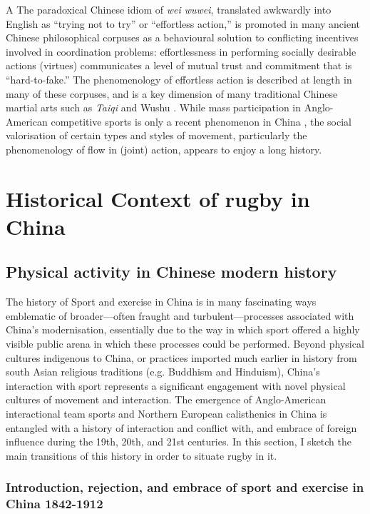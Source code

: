 \begin{CJK}{UTF8}{gbsn}
A The paradoxical Chinese idiom of \textit{wei wuwei}, translated awkwardly into English as ``trying not to try'' or ``effortless action,'' is promoted in many ancient Chinese philosophical corpuses as a behavioural solution to conflicting incentives involved in coordination problems: effortlessness in performing socially desirable actions (virtues) communicates a level of mutual trust and commitment that is ``hard-to-fake.''  The phenomenology of effortless action is described at length in many of these corpuses, and is a key dimension of many traditional Chinese martial arts such as \textit{Taiqi} and Wushu \citep{Morris1998}.  While mass participation in Anglo-American competitive sports is only a recent phenomenon in China \citep{Brownell2008}, the social valorisation of certain types and styles of movement, particularly the phenomenology of flow in (joint) action, appears to enjoy a long history.











\section{Historical Context of rugby in China}

\subsection{Physical activity in Chinese modern history}
The history of Sport and exercise in China is in many fascinating ways emblematic of broader---often fraught and turbulent---processes associated with China's modernisation, essentially due to the way in which sport offered a highly visible public arena in which these processes could be performed.  Beyond physical cultures indigenous to China, or practices imported much earlier in history from south Asian religious traditions (e.g. Buddhism and Hinduism), China's interaction with sport represents a significant engagement with novel physical cultures of movement and interaction.  The emergence of Anglo-American interactional team sports and Northern European calisthenics in China is entangled with a history of interaction and conflict with, and embrace of foreign influence during the 19th, 20th, and 21st centuries.  In this section, I sketch the main transitions of this history in order to situate rugby in it.

  \subsubsection{Introduction, rejection, and embrace of sport and exercise in China 1842-1912 \label{sect:introEnMasse}}


\end{CJK}
